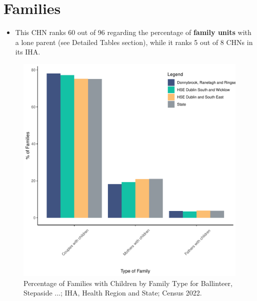 \documentclass{article}
\begin{document}
\section{Families}\label{sect:Fam}
\begin{itemize}
\item This CHN ranks  60 out of 96 regarding the percentage of \textbf{family units} with a lone parent (see Detailed Tables section), while it ranks   5 out of 8 CHNs in its IHA.
\end{itemize}
\begin{figure}[H]
	\centering
	\includegraphics[width = 150mm]{../figures/FamED.pdf}
	\caption{Percentage of Families with Children by Family Type for Ballinteer, Stepaside ...; IHA, Health Region and State; Census 2022.}
	\label{fig:vbnv}
	\end{figure}
	
\end{document}

